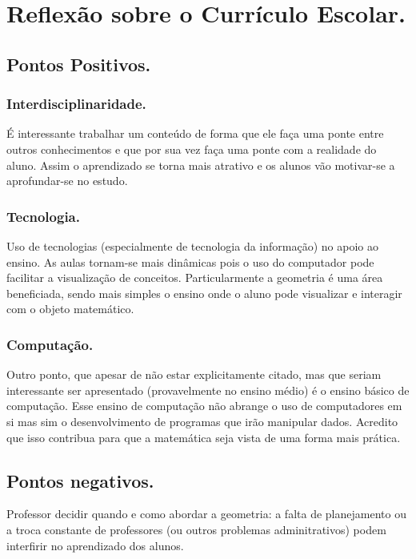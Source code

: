 \documentclass[a4paper,12pt]{article}
\begin{document}
\section{Reflexão sobre o Currículo Escolar.}

\subsection{Pontos Positivos.}

\subsubsection{Interdisciplinaridade.}

É interessante trabalhar um conteúdo de forma que ele faça uma ponte entre outros conhecimentos e que por sua vez faça uma ponte com a realidade do aluno. Assim o aprendizado se torna mais atrativo e os alunos vão motivar-se a aprofundar-se no estudo.

\subsubsection{Tecnologia.}

Uso de tecnologias (especialmente de tecnologia da informação) no apoio ao ensino. As aulas tornam-se mais dinâmicas pois o uso do computador pode facilitar a visualização de conceitos. Particularmente a geometria é uma área beneficiada, sendo mais simples o ensino onde o aluno pode visualizar e interagir com o objeto matemático.

\subsubsection{Computação.}

Outro ponto, que apesar de não estar explicitamente citado, mas que seriam interessante ser apresentado (provavelmente no ensino médio) é o ensino básico  de computação. Esse ensino de computação não abrange o uso de computadores em si mas sim o desenvolvimento de programas que irão manipular dados. Acredito que isso contribua para que a matemática seja vista de uma forma mais prática.

\subsection{Pontos negativos.}

Professor decidir quando e como abordar a geometria: a falta de planejamento ou a troca constante de professores (ou outros problemas adminitrativos) podem interfirir no aprendizado dos alunos.
\end{document}
